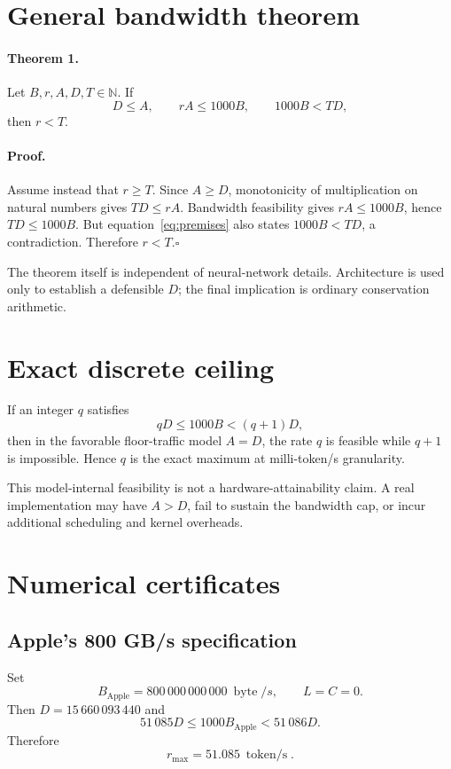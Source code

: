 \documentclass[11pt,a4paper]{article}
\newcommand{\bytes}{\operatorname{byte}}
\newcommand{\tps}{\operatorname{token/s}}
\begin{document}
\section{General bandwidth theorem}

\paragraph{Theorem 1.}
Let $B,r,A,D,T\in\mathbb N$. If
\begin{equation}
 D\le A,\qquad rA\le1000B,
 \qquad1000B<TD,
 \label{eq:premises}
\end{equation}
then $r<T$.

\paragraph{Proof.}
Assume instead that $r\ge T$. Since $A\ge D$, monotonicity of multiplication on natural numbers gives $TD\le rA$. Bandwidth feasibility gives $rA\le1000B$, hence $TD\le1000B$. But equation~\eqref{eq:premises} also states $1000B<TD$, a contradiction. Therefore $r<T$.\hfill$\square$

The theorem itself is independent of neural-network details. Architecture is used only to establish a defensible $D$; the final implication is ordinary conservation arithmetic.

\section{Exact discrete ceiling}

If an integer $q$ satisfies
\begin{equation}
  qD\le1000B<(q+1)D,
  \label{eq:exact}
\end{equation}
then in the favorable floor-traffic model $A=D$, the rate $q$ is feasible while $q+1$ is impossible. Hence $q$ is the exact maximum at milli-token/s granularity.

This model-internal feasibility is not a hardware-attainability claim. A real implementation may have $A>D$, fail to sustain the bandwidth cap, or incur additional scheduling and kernel overheads.

\section{Numerical certificates}

\subsection{Apple's 800 GB/s specification}
Set
\[
B_{\mathrm{Apple}}=800\,000\,000\,000\ \bytes/s,
\qquad L=C=0.
\]
Then $D=15\,660\,093\,440$ and
\begin{equation}
51\,085D\le1000B_{\mathrm{Apple}}<51\,086D.
\end{equation}
Therefore
\begin{equation}
  \boxed{r_{\max}=51.085\ \tps}.
\end{equation}
\end{document}
